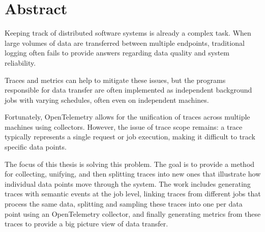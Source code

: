 \chapter{Abstract}
\label{chap:abstract}

Keeping track of distributed software systems is already a complex task.
When large volumes of data are transferred between multiple endpoints, 
traditional logging often fails to provide answers regarding data quality and system reliability.

Traces and metrics can help to mitigate these issues, but the programs responsible for data transfer 
are often implemented as independent background jobs with varying schedules,
often even on independent machines.

Fortunately, OpenTelemetry allows for the unification of traces across multiple machines using collectors.
However, the issue of trace scope remains:
a trace typically represents a single request or job execution,
making it difficult to track specific data points.

The focus of this thesis is solving this problem.
The goal is to provide a method for collecting, unifying, and then splitting traces into
new ones that illustrate how individual data points move through the system.
The work includes generating traces with semantic events at the job level,
linking traces from different jobs that process the same data,
splitting and sampling these traces into one per data point using an OpenTelemetry collector,
and finally generating metrics from these traces to provide a big picture view of data transfer.

